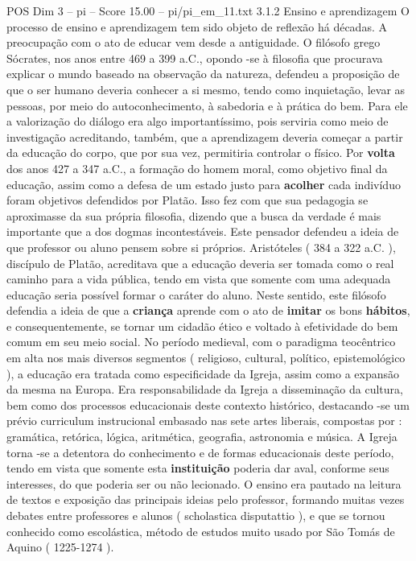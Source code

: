 \begin{textsample}{POS Dim 3 – pi – Score 15.00 – pi/pi\_em\_11.txt}  \label{ex:f3_pos_256}
3.1.2 Ensino e aprendizagem O processo de ensino e aprendizagem tem sido objeto de reflexão há décadas.
A preocupação com o ato de educar vem desde a antiguidade.
O filósofo grego Sócrates, nos anos entre 469 a 399 a.C., opondo -se à filosofia que procurava explicar o mundo baseado na observação da natureza, defendeu a proposição de que o ser humano deveria conhecer a si mesmo, tendo como inquietação, levar as pessoas, por meio do autoconhecimento, à sabedoria e à prática do bem.
Para ele a valorização do diálogo era algo importantíssimo, pois serviria como meio de investigação acreditando, também, que a aprendizagem deveria começar a partir da educação do corpo, que por sua vez, permitiria controlar o físico.
Por \textbf{volta} dos anos 427 a 347 a.C., a formação do homem moral, como objetivo final da educação, assim como a defesa de um estado justo para \textbf{acolher} cada indivíduo foram objetivos defendidos por Platão.
Isso fez com que sua pedagogia se aproximasse da sua própria filosofia, dizendo que a busca da verdade é mais importante que a dos dogmas incontestáveis.
Este pensador defendeu a ideia de que professor ou aluno pensem sobre si próprios.
Aristóteles ( 384 a 322 a.C. ), discípulo de Platão, acreditava que a educação deveria ser tomada como o real caminho para a vida pública, tendo em vista que somente com uma adequada educação seria possível formar o caráter do aluno.
Neste sentido, este filósofo defendia a ideia de que a \textbf{criança} aprende com o ato de \textbf{imitar} os bons \textbf{hábitos}, e consequentemente, se tornar um cidadão ético e voltado à efetividade do bem comum em seu meio social.
No período medieval, com o paradigma teocêntrico em alta nos mais diversos segmentos ( religioso, cultural, político, epistemológico ), a educação era tratada como especificidade da Igreja, assim como a expansão da mesma na Europa.
Era responsabilidade da Igreja a disseminação da cultura, bem como dos processos educacionais deste contexto histórico, destacando -se um prévio curriculum instrucional embasado nas sete artes liberais, compostas por : gramática, retórica, lógica, aritmética, geografia, astronomia e música.
A Igreja torna -se a detentora do conhecimento e de formas educacionais deste período, tendo em vista que somente esta \textbf{instituição} poderia dar aval, conforme seus interesses, do que poderia ser ou não lecionado.
O ensino era pautado na leitura de textos e exposição das principais ideias pelo professor, formando muitas vezes debates entre professores e alunos ( scholastica disputattio ), e que se tornou conhecido como escolástica, método de estudos muito usado por São Tomás de Aquino ( 1225-1274 ).

\end{textsample}
